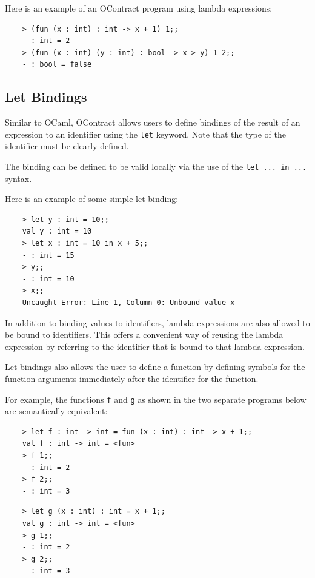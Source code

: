 \documentclass[a4paper]{article}
\begin{document}
Here is an example of an OContract program using lambda expressions:

\begin{verbatim}
    > (fun (x : int) : int -> x + 1) 1;;
    - : int = 2
    > (fun (x : int) (y : int) : bool -> x > y) 1 2;;
    - : bool = false
\end{verbatim}

\subsection{Let Bindings}

Similar to OCaml, OContract allows users to define bindings of the result of an expression to an identifier using the \texttt{let} keyword.
Note that the type of the identifier must be clearly defined.

The binding can be defined to be valid locally via the use of the \texttt{let ... in ...} syntax.

Here is an example of some simple let binding:

\begin{verbatim}
    > let y : int = 10;;
    val y : int = 10
    > let x : int = 10 in x + 5;;
    - : int = 15
    > y;;
    - : int = 10
    > x;;
    Uncaught Error: Line 1, Column 0: Unbound value x
\end{verbatim}

In addition to binding values to identifiers, lambda expressions are also allowed to be bound to identifiers.
This offers a convenient way of reusing the lambda expression by referring to the identifier that is bound to that lambda expression.

Let bindings also allows the user to define a function by defining symbols for the function arguments immediately after the identifier for the function.

For example, the functions \texttt{f} and \texttt{g} as shown in the two separate programs below are semantically equivalent:

\begin{verbatim}
    > let f : int -> int = fun (x : int) : int -> x + 1;;
    val f : int -> int = <fun>
    > f 1;;
    - : int = 2
    > f 2;;
    - : int = 3
\end{verbatim}

\begin{verbatim}
    > let g (x : int) : int = x + 1;;
    val g : int -> int = <fun>
    > g 1;;
    - : int = 2
    > g 2;;
    - : int = 3
\end{verbatim}
\end{document}
